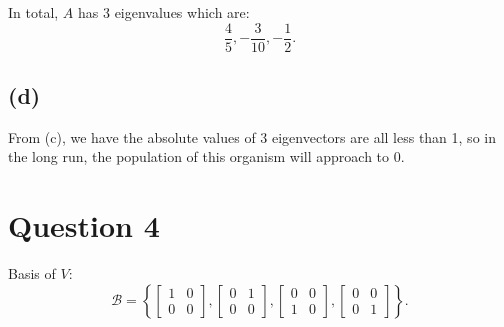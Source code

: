 \documentclass[10pt]{article}
\begin{document}
\noindent In total, $A$ has 3 eigenvalues which are: $$\frac{4}{5}, -\frac{3}{10}, -\frac{1}{2}.$$



\subsection*{(d)}
\noindent From (c), we have the absolute values of 3 eigenvectors are all less than 1, so in the long run, the population of this organism will approach to 0.


\section*{Question 4}

\noindent Basis of $V$:
$$\mathcal{B} = \left\{ 
\begin{bmatrix} 1 & 0 \\ 0 & 0 \end{bmatrix},
\begin{bmatrix} 0 & 1 \\ 0 & 0 \end{bmatrix},
\begin{bmatrix} 0 & 0 \\ 1 & 0 \end{bmatrix},
\begin{bmatrix} 0 & 0 \\ 0 & 1 \end{bmatrix}
\right\}.$$
\end{document}
